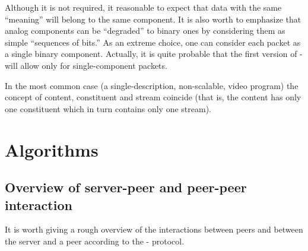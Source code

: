 \documentclass{medusabook}
\begin{document}
\begin{description}
  Although it is not required, it reasonable to expect that data with
  the same ``meaning'' will belong to the same component.  It is also
  worth to emphasize that analog components can be ``degraded'' to
  binary ones by considering them as simple ``sequences of bits.''  As
  an extreme choice, one can consider each packet as a single binary
  component.  Actually, it is quite probable that the first version of
  \medusa- will allow only for single-component packets.
\end{description}
%
\begin{commento}
In the most common case (a
single-description, non-scalable, video program) the concept of
content, constituent and stream coincide (that is, the content has
only one constituent which in turn contains only one stream).
\end{commento}

\chapter{Algorithms}
\label{chap:0;medusa_book}

\section{Overview of server-peer and peer-peer interaction}
\label{sect:0.1;medusa_book}

It is worth giving a rough overview of the interactions between peers
and between the server and a peer according to the \medusa- protocol.
\end{document}
